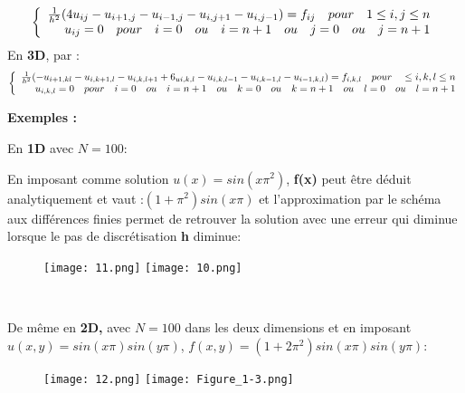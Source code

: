 \documentclass[a4paper,12pt,twoside]{report}
\begin{document}
\[
\left\{
\begin{array}{r c l}
\frac{1}{h^{2}}(4u_{ij} -u_{i+1,j} -u_{i-1,j}-u_{i,j+1} -u_{i,j-1})=f_{ij} \quad pour \quad 1 \leq i,j \leq n  \\
u_{ij}=0 \quad pour\quad i=0\quad ou \quad i=n+1\quad ou \quad j=0\quad ou \quad j=n+1\\
\end{array}
\right.
\]
	En \textbf{\color[rgb]{0,0.13,0.75}3D}, par :
\[
\left\{
\begin{array}{r c l}
\frac{1}{h^{2}}(-u_{i+1,kl} - u_{i,k+1,l} -u_{i,k,l+1} + 6_{ui,k,l} -u_{i,k,l-1} - u_{i,k-1,l} -u_{i-1,k,l}) = f_{i,k,l} \quad pour  \quad \leq i,k,l\leq n   \\
u_{i,k,l}=0  \quad pour \quad  i=0 \quad  ou \quad    i=n+1 \quad   ou \quad  k=0 \quad  ou \quad  k=n+1\quad   ou \quad  l=0 \quad  ou \quad  l=n+1 
\\
\end{array}
\right.
\]






\textbf{Exemples :
}

En \textbf{\color[rgb]{0,0.13,0.75}
 1D} avec \textbf{$N=100:$}

En imposant comme solution $u(x)=sin(x{\pi}^2)$, \textbf{ f(x) } peut être déduit analytiquement et vaut :$ (1+{\pi}^2)sin(x\pi) $ et l'approximation par le schéma aux différences finies permet de retrouver la solution avec une erreur qui diminue lorsque le pas de discrétisation \textbf{h} diminue:
\begin{figure}[htpb!]
\texttt{[image: 11.png]}
  \texttt{[image: 10.png]}

\end{figure}


\












\clearpage

De même en \textbf{\color[rgb]{0,0.13,0.75}
2D,} avec \textbf{$N= 100$ } dans les deux dimensions et en imposant $u(x,y)=sin(x{\pi})sin(y{\pi})$, $ f(x,y)=(1+2{\pi}^2)sin(x{\pi})sin(y{\pi})$:
\begin{figure}[htpb!]
 
\texttt{[image: 12.png]} 
  \texttt{[image: Figure\_1-3.png]}
  \label{fig:exemple}
\end{figure}
\end{document}
